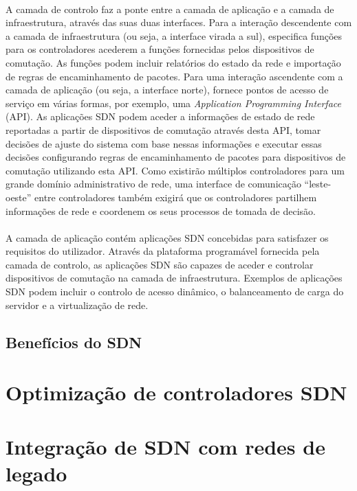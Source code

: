 \documentclass{llncs}
\begin{document}
\paragraph{}
A camada de controlo faz a ponte entre a camada de aplicação e a camada de infraestrutura, através das suas duas interfaces. Para a interação descendente com a camada de infraestrutura (ou seja, a interface virada a sul), especifica funções para os controladores acederem a funções fornecidas pelos dispositivos de comutação. As funções podem incluir relatórios do estado da rede e importação de regras de encaminhamento de pacotes. Para uma interação ascendente com a camada de aplicação (ou seja, a interface norte), fornece pontos de acesso de serviço em várias formas, por exemplo, uma \textit{Application Programming Interface} (API). As aplicações SDN podem aceder a informações de estado de rede reportadas a partir de dispositivos de comutação através desta API, tomar decisões de ajuste do sistema com base nessas informações e executar essas decisões configurando regras de encaminhamento de pacotes para dispositivos de comutação utilizando esta API. Como existirão múltiplos controladores para um grande domínio administrativo de rede, uma interface de comunicação “leste-oeste” entre controladores também exigirá que os controladores partilhem informações de rede e coordenem os seus processos de tomada de decisão.
\paragraph{}
A camada de aplicação contém aplicações SDN concebidas para satisfazer os requisitos do utilizador. Através da plataforma programável fornecida pela camada de controlo, as aplicações SDN são capazes de aceder e controlar dispositivos de comutação na camada de infraestrutura. Exemplos de aplicações SDN podem incluir o controlo de acesso dinâmico, o balanceamento de carga do servidor e a virtualização de rede.

\subsection{Benefícios do SDN}

\section{Optimização de controladores SDN}

\section{Integração de SDN com redes de legado}
\end{document}
